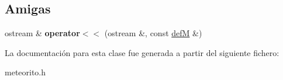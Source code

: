 \subsection*{Amigas}
\begin{DoxyCompactItemize}
\item 
\hypertarget{classdefM_a3784f8dcda03b04a658b79b87c603945}{ostream \& {\bfseries operator$<$$<$} (ostream \&, const \hyperlink{classdefM}{def\-M} \&)}\label{classdefM_a3784f8dcda03b04a658b79b87c603945}

\end{DoxyCompactItemize}


La documentación para esta clase fue generada a partir del siguiente fichero\-:\begin{DoxyCompactItemize}
\item 
meteorito.\-h\end{DoxyCompactItemize}
